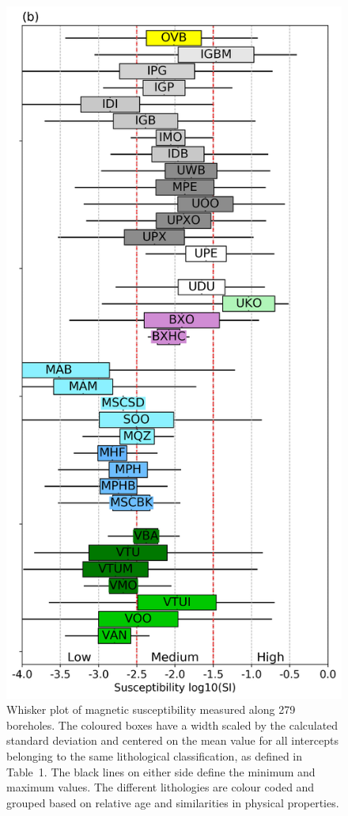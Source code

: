 \documentclass[paper]{geophysics}
\begin{document}
\begin{figure}[p!]
\includegraphics[width=\columnwidth]{Figures/Figure9.png}
\caption{Whisker plot of magnetic susceptibility measured along 279 boreholes. The coloured boxes have a width scaled by the calculated standard deviation and centered on the mean value for all intercepts belonging to the same lithological classification, as defined in Table~1. The black lines on either side define the minimum and maximum values. The different lithologies are colour coded and grouped based on relative age and similarities in physical properties.}
\label{Kevitsa_PhysProp}
\end{figure}
\end{document}
